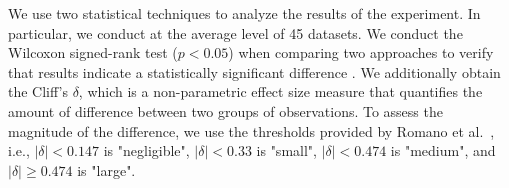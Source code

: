 We use two statistical techniques to analyze the results of the experiment. In particular, we conduct at the average level of 45 datasets. We conduct the Wilcoxon signed-rank test ($p<0.05$) when comparing two approaches to verify that results indicate a statistically significant difference \cite{Demsar:2006:SCC:1248547.1248548}. 
We additionally obtain the Cliff's $\delta$, which is a non-parametric effect size measure that quantifies the amount of difference between two groups of observations. 
To assess the magnitude of the difference, we use the thresholds provided by Romano et al.~\cite{romano2006should}, i.e., $|\delta|<0.147$ is "negligible", $|\delta|<0.33$ is "small", $|\delta|<0.474$ is "medium", and $|\delta| \geq 0.474$  is "large".

\clearpage